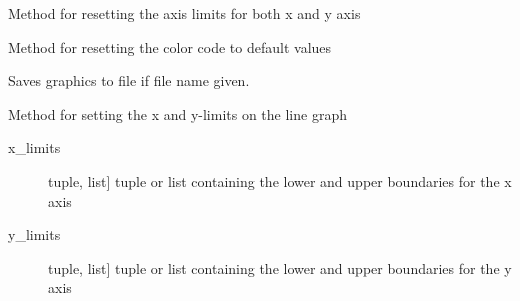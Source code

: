 \documentclass[a4paper,10pt,english]{sphinxmanual}
\begin{document}
\begin{fulllineitems}
\begin{fulllineitems}
\begin{description}
\end{description}

\end{fulllineitems}


\begin{fulllineitems}
\label{\detokenize{simulation:biosim.simulation.BioSim.reset_axis_limits}}
Method for resetting the axis limits for both x and y axis

\end{fulllineitems}


\begin{fulllineitems}
\label{\detokenize{simulation:biosim.simulation.BioSim.reset_color_code_limits}}
Method for resetting the color code to default values

\end{fulllineitems}


\begin{fulllineitems}
\label{\detokenize{simulation:biosim.simulation.BioSim.save_graphics}}
Saves graphics to file if file name given.

\end{fulllineitems}


\begin{fulllineitems}
\label{\detokenize{simulation:biosim.simulation.BioSim.set_axis_limits}}
Method for setting the x and y-limits on the line graph
\begin{description}
\item[{x\_limits}] \leavevmode{[}tuple, list{]}
tuple or list containing the lower and upper boundaries for the
x axis

\item[{y\_limits}] \leavevmode{[}tuple, list{]}
tuple or list containing the lower and upper boundaries for the
y axis


\end{description}
\end{fulllineitems}
\end{fulllineitems}
\end{document}
